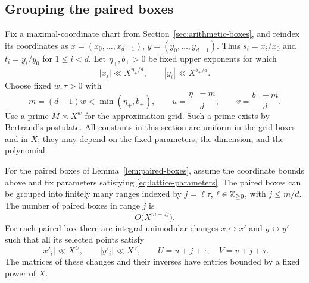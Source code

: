 \subsection{Grouping the paired boxes}

Fix a maximal-coordinate chart from Section~\ref{sec:arithmetic-boxes},
and reindex its coordinates as
$x=(x_0,\ldots,x_{d-1})$, $y=(y_0,\ldots,y_{d-1})$.
Thus $s_i=x_i/x_0$ and $t_i=y_i/y_0$ for $1\le i<d$.
Let $\eta_+,b_+>0$ be fixed upper exponents for which
\[
 |x_i|\ll X^{\eta_+/d},\qquad |y_i|\ll X^{b_+/d}.
\]
Choose fixed $w,\tau>0$ with
\begin{equation}\label{eq:lattice-parameters}
 m=(d-1)w<\min(\eta_+,b_+),\qquad
 u=\frac{\eta_+-m}{d},\qquad v=\frac{b_+-m}{d}.
\end{equation}
Use a prime $M\asymp X^w$ for the approximation grid. Such a prime
exists by Bertrand's postulate. All constants in this section are
uniform in the grid boxes and in $X$; they may depend on the fixed
parameters, the dimension, and the polynomial.

\begin{proposition}\label{prop:lattice-boxes}
For the paired boxes of Lemma~\ref{lem:paired-boxes}, assume the
coordinate bounds above and fix parameters satisfying
\eqref{eq:lattice-parameters}. The paired boxes can be grouped into
finitely many ranges indexed by $j=\ell\tau$, $\ell\in\mathbb Z_{\ge0}$,
with $j\le m/d$. The number of paired boxes in range $j$ is
\begin{equation}\label{eq:lattice-box-count}
 O\bigl(X^{m-dj}\bigr).
\end{equation}
For each paired box there are integral unimodular changes
$x\leftrightarrow x'$ and $y\leftrightarrow y'$ such that all
its selected points satisfy
\begin{equation}\label{eq:lattice-coordinate-bounds}
 |x'_i|\ll X^U,\qquad |y'_i|\ll X^V,
 \qquad U=u+j+\tau,\quad V=v+j+\tau.
\end{equation}
The matrices of these changes and their inverses have entries
bounded by a fixed power of $X$.
\end{proposition}

